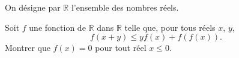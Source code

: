 On désigne par $\mathbb{R}$ l'ensemble des nombres réels.

Soit $f$ une fonction de $\mathbb{R}$ dans $\mathbb{R}$ telle que, pour tous réels $x$, $y$,
\[
f(x + y) \leqslant yf(x) + f(f(x)).
\]
Montrer que $f(x) = 0$ pour tout réel $x \leqslant 0$.
